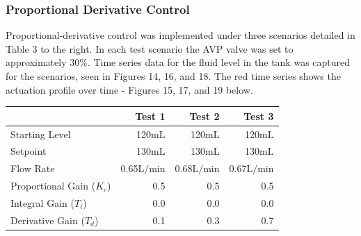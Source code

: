 \documentclass{article}
\begin{document}
\clearpage

\subsubsection{Proportional Derivative Control}

\begin{minipage}{0.4\textwidth}
	Proportional-derivative control was implemented under three scenarios detailed in Table 3 to the right. In each test scenario the AVP valve was set to approximately 30\%. Time series data for the fluid level in the tank was captured for the scenarios, seen in Figures 14, 16, and 18. The red time series shows the actuation profile over time - Figures 15, 17, and 19 below. 
\end{minipage}
\hspace{0.5cm}
\begin{minipage}{0.45\textwidth}
	\small
	\begin{tabular}{lrrr}
		\toprule
		& Test 1 & Test 2 & Test 3 \\
		\midrule
		Starting Level & 120$\si{\milli\liter}$ & 120$\si{\milli\liter}$ & 120$\si{\milli\liter}$ \\
		Setpoint & 130$\si{\milli\liter}$ & 130$\si{\milli\liter}$ & 130$\si{\milli\liter}$ \\
		Flow Rate & 0.65$\si{\liter\per\minute}$ & 0.68$\si{\liter\per\minute}$ & 0.67$\si{\liter\per\minute}$ \\
		Proportional Gain ($K_c$) & 0.5 & 0.5 & 0.5 \\
		Integral Gain ($T_i$) & 0.0 & 0.0 & 0.0 \\
		Derivative Gain ($T_d$) & 0.1 & 0.3 & 0.7 \\
		\bottomrule
	\end{tabular}
\end{minipage}
\end{document}
